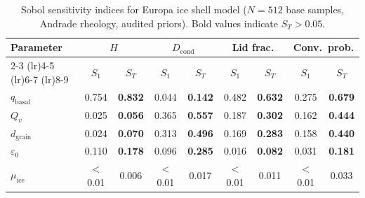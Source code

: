 \begin{table}[t]
\centering
\caption{Sobol sensitivity indices for Europa ice shell model ($N = 512$ base samples, Andrade rheology, audited priors). Bold values indicate $S_T > 0.05$.}
\label{tab:sobol}
\begin{tabular}{lcccccccc}
\toprule
Parameter & \multicolumn{2}{c}{$H$} & \multicolumn{2}{c}{$D_\mathrm{cond}$} & \multicolumn{2}{c}{Lid frac.} & \multicolumn{2}{c}{Conv.\ prob.} \\
\cmidrule(lr){2-3} \cmidrule(lr){4-5} \cmidrule(lr){6-7} \cmidrule(lr){8-9}
 & $S_1$ & $S_T$ & $S_1$ & $S_T$ & $S_1$ & $S_T$ & $S_1$ & $S_T$ \\
\midrule
$q_\mathrm{basal}$ & 0.754 & \textbf{0.832} & 0.044 & \textbf{0.142} & 0.482 & \textbf{0.632} & 0.275 & \textbf{0.679} \\
$Q_v$ & 0.025 & \textbf{0.056} & 0.365 & \textbf{0.557} & 0.187 & \textbf{0.302} & 0.162 & \textbf{0.444} \\
$d_\mathrm{grain}$ & 0.024 & \textbf{0.070} & 0.313 & \textbf{0.496} & 0.169 & \textbf{0.283} & 0.158 & \textbf{0.440} \\
$\varepsilon_0$ & 0.110 & \textbf{0.178} & 0.096 & \textbf{0.285} & 0.016 & \textbf{0.082} & 0.031 & \textbf{0.181} \\
$\mu_\mathrm{ice}$ & $<$0.01 & 0.006 & $<$0.01 & 0.017 & $<$0.01 & 0.011 & $<$0.01 & 0.033 \\
\bottomrule
\end{tabular}
\end{table}
